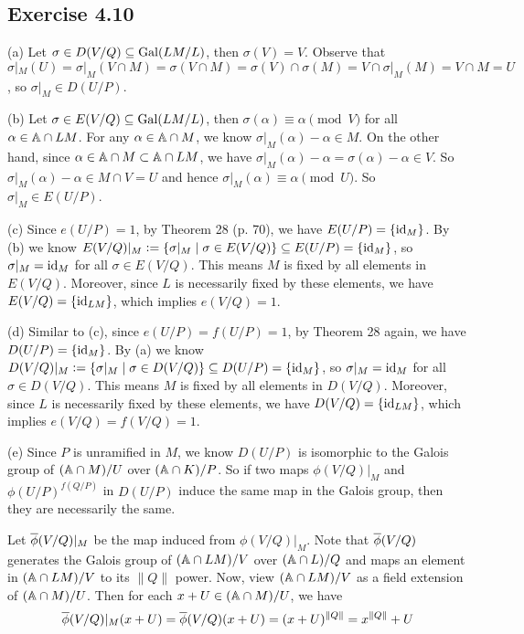 \documentclass[../Marcus.tex]{subfiles}
\begin{document}
\subsection*{Exercise 4.10}

(a) Let $\sigma\in D(V/Q)\sbe\Gal(LM/L)$, then $\sigma(V)=V$. Observe that $\sigma|_M(U)=\sigma|_M(V\cap M)=\sigma(V\cap M)=\sigma(V)\cap\sigma(M)=V\cap\sigma|_M(M)=V\cap M=U$, so $\sigma|_M\in D(U/P)$.

(b) Let $\sigma\in E(V/Q)\sbe\Gal(LM/L)$, then $\sigma(\alpha)\equiv\alpha \pmod{V}$ for all $\alpha\in \AA \cap LM$. For any $\alpha\in \AA \cap M$, we know $\sigma|_M(\alpha)-\alpha\in M$. On the other hand, since $\alpha\in \AA \cap M \subset \AA \cap LM$, we have $\sigma|_M(\alpha)-\alpha=\sigma(\alpha)-\alpha\in V$. So $\sigma|_M(\alpha)-\alpha\in M\cap V=U$ and hence $\sigma|_M(\alpha)\equiv\alpha\pmod{U}$. So $\sigma|_M\in E(U/P)$.

(c) Since $e(U/P)=1$, by Theorem 28 (p. 70), we have $E(U/P)=\{\id_M\}$. By (b) we know $E(V/Q)|_M:=\{\sigma|_M \mid \sigma\in E(V/Q)\} \sbe E(U/P)=\{\id_M\}$, so $\sigma|_M=\id_M$ for all $\sigma\in E(V/Q)$. This means $M$ is fixed by all elements in $E(V/Q)$. Moreover, since $L$ is necessarily fixed by these elements, we have $E(V/Q)=\{\id_{LM}\}$, which implies $e(V/Q)=1$.

(d) Similar to (c), since $e(U/P)=f(U/P)=1$, by Theorem 28 again, we have $D(U/P)=\{\id_M\}$. By (a) we know $D(V/Q)|_M:=\{\sigma|_M \mid \sigma\in D(V/Q)\} \sbe D(U/P)=\{\id_M\}$, so $\sigma|_M=\id_M$ for all $\sigma\in D(V/Q)$. This means $M$ is fixed by all elements in $D(V/Q)$. Moreover, since $L$ is necessarily fixed by these elements, we have $D(V/Q)=\{\id_{LM}\}$, which implies $e(V/Q)=f(V/Q)=1$.

(e) Since $P$ is unramified in $M$, we know $D(U/P)$ is isomorphic to the Galois group of $(\AA \cap M)/U$ over $(\AA \cap K)/P$. So if two maps $\phi(V/Q)|_M$ and $\phi(U/P)^{f(Q/P)}$ in $D(U/P)$ induce the same map in the Galois group, then they are necessarily the same. 

Let $\ovl{\phi}(V/Q)|_M$ be the map induced from $\phi(V/Q)|_M$. Note that $\ovl{\phi}(V/Q)$ generates the Galois group of $(\AA \cap LM)/V$ over $(\AA \cap L)/Q$ and maps an element in $(\AA \cap LM)/V$ to its $\|Q\|$ power. Now, view $(\AA \cap LM)/V$ as a field extension of $(\AA \cap M)/U$. Then for each $x+U \in (\AA \cap M)/U$, we have
$$
\ovl{\phi}(V/Q)|_M(x+U)=\ovl{\phi}(V/Q)(x+U)=(x+U)^{\|Q\|}=x^{\|Q\|}+U
$$
\end{document}
